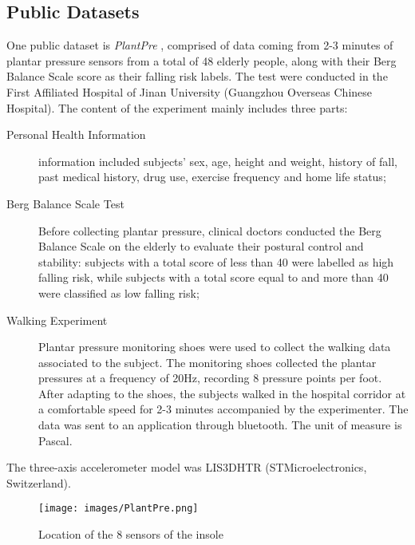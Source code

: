 \subsection{Public Datasets}
One public dataset is \textit{PlantPre} \cite{PlantPre}, comprised of data coming from 2-3 minutes of plantar pressure sensors from a total of 48 elderly people, along with their Berg Balance Scale score as their falling risk labels. The test were conducted in the First Affiliated Hospital of Jinan University (Guangzhou Overseas Chinese Hospital).
The content of the experiment mainly includes three parts: 
\begin{description}
    \item[Personal Health Information] information included subjects’ sex, age, height and weight, history of fall, past medical history, drug use, exercise frequency and home life status;
    \item[Berg Balance Scale Test] Before collecting plantar pressure, clinical doctors conducted the Berg Balance Scale on the elderly to evaluate their postural control and stability: subjects with a total score of less than 40 were labelled as high falling risk, while subjects with a total score equal to and more than 40 were classified as low falling risk;
    \item[Walking Experiment] Plantar pressure monitoring shoes were used to collect the walking data associated to the subject. The monitoring shoes collected the plantar pressures at a frequency of 20Hz, recording 8 pressure points per foot. After adapting to the shoes, the subjects walked in the hospital corridor at a comfortable speed for 2-3 minutes accompanied by the experimenter. The data was sent to an application through bluetooth. The unit of measure is Pascal.
\end{description}
The three-axis accelerometer model was LIS3DHTR (STMicroelectronics, Switzerland).

\begin{figure}[h!]
    \centering
    \texttt{[image: images/PlantPre.png]}
    \caption{Location of the 8 sensors of the insole}
    \label{fig:PlantPre}
\end{figure}
\FloatBarrier

